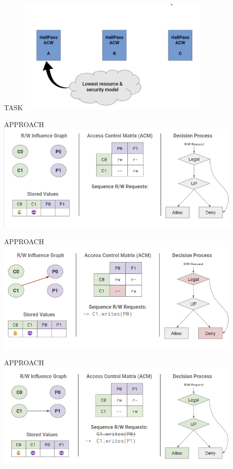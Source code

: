 \begin{frame}{TASK}
    \centering
    \includegraphics[height=0.7\textheight,width=0.7\textwidth,keepaspectratio]{models.png}
\end{frame}

\begin{frame}{APPROACH}
    \centering
    \includegraphics[height=0.9\textheight,width=0.9\textwidth,keepaspectratio]{slide 0.png}
\end{frame}

\begin{frame}{APPROACH}
    \centering
    \includegraphics[height=0.9\textheight,width=0.9\textwidth,keepaspectratio]{slide 1.png}
\end{frame}

\begin{frame}{APPROACH}
    \centering
    \includegraphics[height=0.9\textheight,width=0.9\textwidth,keepaspectratio]{slide 2.png}
\end{frame}

